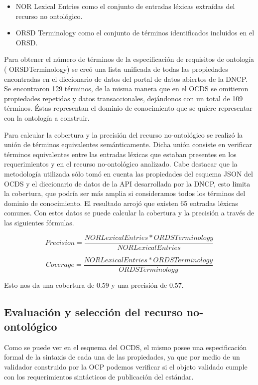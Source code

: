 \begin{itemize}
    \item NOR Lexical Entries como el conjunto de entradas léxicas extraídas del recurso no ontológico.	
    \item ORSD Terminology como el conjunto de términos identificados incluidos en el ORSD. 
\end{itemize}
Para obtener el número de términos de la especificación de requisitos de ontología ( ORSDTerminology) se creó una lista unificada de todas las propiedades encontradas en el diccionario de datos del portal de datos abiertos de la DNCP.  Se encontraron 129 términos, de la misma manera que en el OCDS se omitieron propiedades repetidas y datos transaccionales, dejándonos con un total de 109 términos. Éstas representan el dominio de conocimiento que se quiere representar con la ontología a construir.

Para calcular la cobertura y la precisión del recurso no-ontológico se realizó la unión de términos equivalentes semánticamente. Dicha unión consiste en verificar términos equivalentes entre las entradas léxicas que estaban presentes en los requerimientos y en el recurso no-ontológico analizado. Cabe destacar que la metodología utilizada sólo tomó en cuenta las propiedades del esquema JSON del OCDS y el diccionario de datos de la API desarrollada por la DNCP, esto limita la cobertura, que podría ser más amplia si consideramos todos los términos del dominio de conocimiento. El resultado arrojó que existen 65 entradas léxicas comunes. Con estos datos se puede calcular la cobertura y la precisión a través de las siguientes fórmulas.

\begin{equation}
    Precision =  \frac{{NORLexicalEntries}*{ORDSTerminology} }{{NORLexicalEntries}}    
\end{equation}

\begin{equation}
     Coverage = \frac{{NORLexicalEntries}* {ORDSTerminology}}{{ORDSTerminology}}   
\end{equation}

Esto nos da una cobertura de 0.59 y una precisión de 0.57. 

\subsection{Evaluación y selección del recurso no-ontológico}

Como se puede ver en el esquema del OCDS, el mismo posee una especificación formal de la sintaxis de cada una de las propiedades, ya que por medio de un validador construido por la OCP podemos verificar si el objeto validado cumple con los requerimientos sintácticos de publicación del estándar.

